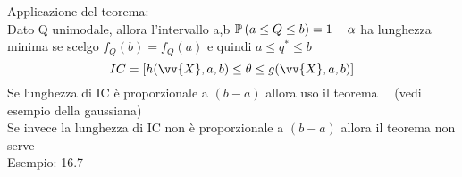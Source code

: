 Applicazione del teorema:\\
Dato Q unimodale, allora l'intervallo a,b $\mathbb{P} \left( a\le Q \le b \right) = 1-\alpha$ ha lunghezza minima se scelgo $f_Q(b)=f_Q(a)$ e quindi $a\le q^* \le b$
\[
IC = [h(\vv{X},a,b)\le \theta \le g(\vv{X},a,b)]
\]
Se lunghezza di IC è proporzionale a $(b-a)$ allora uso il teorema \ \ (vedi esempio della gaussiana)\\
Se invece la lunghezza di IC non è proporzionale a $(b-a)$ allora il  teorema non serve\\

Esempio: 16.7\\